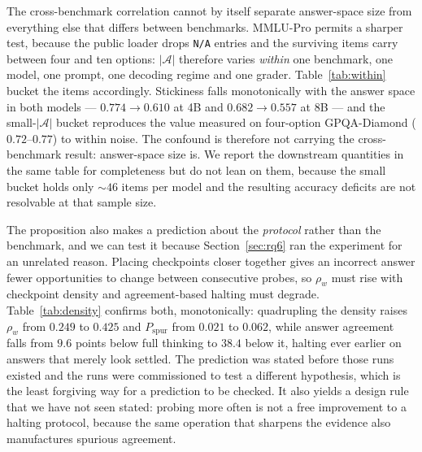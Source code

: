 \documentclass[acmsmall]{acmart}
\theoremstyle{acmdefinition}%
\theoremstyle{acmplain}}{}%
\begin{document}
The cross-benchmark correlation cannot by itself separate answer-space size from everything else that differs between benchmarks. MMLU-Pro permits a sharper test, because the public loader drops \texttt{N/A} entries and the surviving items carry between four and ten options: $|\mathcal{A}|$ therefore varies \emph{within} one benchmark, one model, one prompt, one decoding regime and one grader. Table~\ref{tab:within} bucket the items accordingly. Stickiness falls monotonically with the answer space in both models --- $0.774 \to 0.610$ at 4B and $0.682 \to 0.557$ at 8B --- and the small-$|\mathcal{A}|$ bucket reproduces the value measured on four-option GPQA-Diamond ($0.72$--$0.77$) to within noise. The confound is therefore not carrying the cross-benchmark result: answer-space size is. We report the downstream quantities in the same table for completeness but do not lean on them, because the small bucket holds only ${\sim}46$ items per model and the resulting accuracy deficits are not resolvable at that sample size.

The proposition also makes a prediction about the \emph{protocol} rather than the benchmark, and we can test it because Section~\ref{sec:rq6} ran the experiment for an unrelated reason. Placing checkpoints closer together gives an incorrect answer fewer opportunities to change between consecutive probes, so $\rho_w$ must rise with checkpoint density and agreement-based halting must degrade. Table~\ref{tab:density} confirms both, monotonically: quadrupling the density raises $\rho_w$ from $0.249$ to $0.425$ and $P_{\mathrm{spur}}$ from $0.021$ to $0.062$, while answer agreement falls from $9.6$ points below full thinking to $38.4$ below it, halting ever earlier on answers that merely look settled. The prediction was stated before those runs existed and the runs were commissioned to test a different hypothesis, which is the least forgiving way for a prediction to be checked. It also yields a design rule that we have not seen stated: probing more often is not a free improvement to a halting protocol, because the same operation that sharpens the evidence also manufactures spurious agreement.
\end{document}
